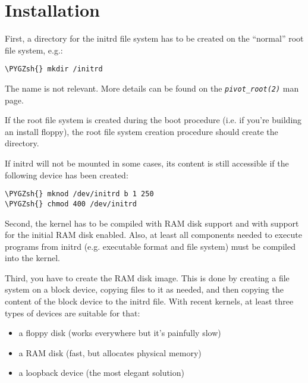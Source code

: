 \documentclass[a4paper,8pt,english]{sphinxmanual}
\def\PYGZsh{\char`\#}
\begin{document}
\section{Installation}
\label{admin-guide/initrd:installation}
First, a directory for the initrd file system has to be created on the
``normal'' root file system, e.g.:

\begin{Verbatim}[commandchars=\\\{\}]
\PYGZsh{} mkdir /initrd
\end{Verbatim}

The name is not relevant. More details can be found on the
\emph{\texttt{pivot\_root(2)}} man page.

If the root file system is created during the boot procedure (i.e. if
you're building an install floppy), the root file system creation
procedure should create the  directory.

If initrd will not be mounted in some cases, its content is still
accessible if the following device has been created:

\begin{Verbatim}[commandchars=\\\{\}]
\PYGZsh{} mknod /dev/initrd b 1 250
\PYGZsh{} chmod 400 /dev/initrd
\end{Verbatim}

Second, the kernel has to be compiled with RAM disk support and with
support for the initial RAM disk enabled. Also, at least all components
needed to execute programs from initrd (e.g. executable format and file
system) must be compiled into the kernel.

Third, you have to create the RAM disk image. This is done by creating a
file system on a block device, copying files to it as needed, and then
copying the content of the block device to the initrd file. With recent
kernels, at least three types of devices are suitable for that:
\begin{itemize}
\item {} 
a floppy disk (works everywhere but it's painfully slow)

\item {} 
a RAM disk (fast, but allocates physical memory)

\item {} 
a loopback device (the most elegant solution)

\end{itemize}
\end{document}
